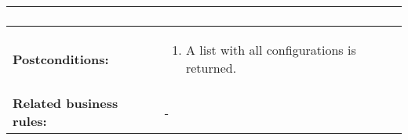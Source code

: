 \begin{tabularx}{\linewidth}{|l|X|}
\begin{enumerate}
						\end{enumerate} \\
\hline
\textbf{Postconditions:} & 
  \begin{minipage}{\linewidth}
  \vspace{0.05em}
  \begin{enumerate}
	\item A list with all configurations is returned.
  \end{enumerate}
  \vspace{0.05em}
\end{minipage}
\\
\hline
\textbf{Related business rules:} & - \\
\hline
\end{tabularx}


